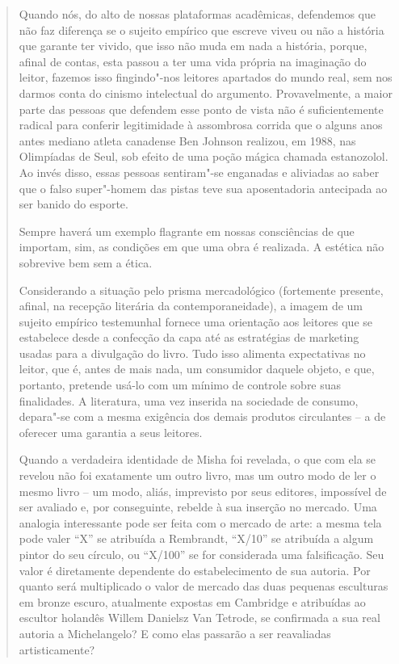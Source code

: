 \begin{quote}
Quando nós, do alto de nossas plataformas acadêmicas, defendemos que não
faz diferença se o sujeito empírico que escreve viveu ou não a história
que garante ter vivido, que isso não muda em nada a história, porque,
afinal de contas, esta passou a ter uma vida própria na imaginação do
leitor, fazemos isso fingindo"-nos leitores apartados do mundo real, sem
nos darmos conta do cinismo intelectual do argumento. Provavelmente, a
maior parte das pessoas que defendem esse ponto de vista não é
suficientemente radical para conferir legitimidade à assombrosa corrida
que o alguns anos antes mediano atleta canadense Ben Johnson realizou,
em 1988, nas Olimpíadas de Seul, sob efeito de uma poção mágica chamada
estanozolol. Ao invés disso, essas pessoas sentiram"-se enganadas e
aliviadas ao saber que o falso super"-homem das pistas teve sua
aposentadoria antecipada ao ser banido do esporte.

Sempre haverá um exemplo flagrante em nossas consciências de que
importam, sim, as condições em que uma obra é realizada. A estética não
sobrevive bem sem a ética.

Considerando a situação pelo prisma mercadológico (fortemente presente,
afinal, na recepção literária da contemporaneidade), a imagem de um
sujeito empírico testemunhal fornece uma orientação aos leitores que se
estabelece desde a confecção da capa até as estratégias de marketing
usadas para a divulgação do livro. Tudo isso alimenta expectativas no
leitor, que é, antes de mais nada, um consumidor daquele objeto, e que,
portanto, pretende usá-lo com um mínimo de controle sobre suas
finalidades. A literatura, uma vez inserida na sociedade de consumo,
depara"-se com a mesma exigência dos demais produtos circulantes -- a de
oferecer uma garantia a seus leitores.

Quando a verdadeira identidade de Misha foi revelada, o que com ela se
revelou não foi exatamente um outro livro, mas um outro modo de ler o
mesmo livro -- um modo, aliás, imprevisto por seus editores, impossível
de ser avaliado e, por conseguinte, rebelde à sua inserção no mercado.
Uma analogia interessante pode ser feita com o mercado de arte: a mesma
tela pode valer ``X'' se atribuída a Rembrandt, ``X/10'' se atribuída a
algum pintor do seu círculo, ou ``X/100'' se for considerada uma
falsificação. Seu valor é diretamente dependente do estabelecimento de
sua autoria. Por quanto será multiplicado o valor de mercado das duas
pequenas esculturas em bronze escuro, atualmente expostas em Cambridge e
atribuídas ao escultor holandês Willem Danielsz Van Tetrode, se
confirmada a sua real autoria a Michelangelo? E como elas passarão a ser
reavaliadas artisticamente?


\end{quote}
